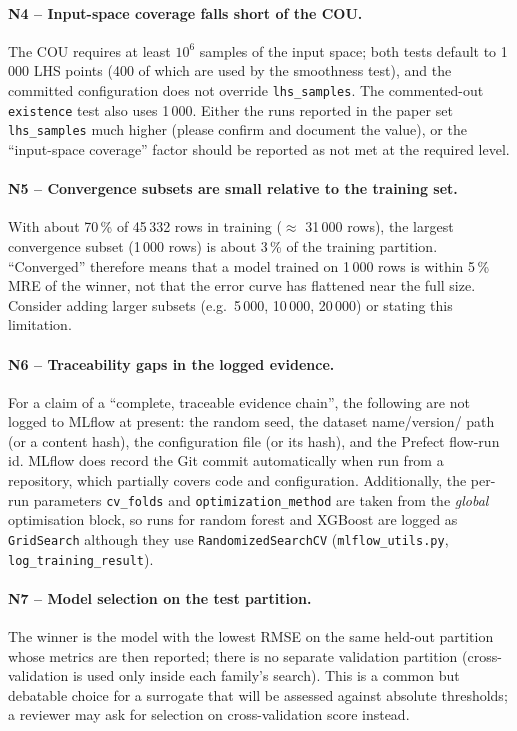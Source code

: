 \paragraph{N4 -- Input-space coverage falls short of the COU.}
The COU requires at least $10^6$ samples of the input space; both tests
default to 1\,000 LHS points (400 of which are used by the smoothness test),
and the committed configuration does not override \texttt{lhs\_samples}. The
commented-out \texttt{existence} test also uses 1\,000. Either the runs
reported in the paper set \texttt{lhs\_samples} much higher (please confirm
and document the value), or the ``input-space coverage'' factor should be
reported as not met at the required level.

\paragraph{N5 -- Convergence subsets are small relative to the training set.}
With about 70\,\% of 45\,332 rows in training ($\approx$ 31\,000 rows), the
largest convergence subset (1\,000 rows) is about 3\,\% of the training
partition. ``Converged'' therefore means that a model trained on 1\,000 rows
is within 5\,\% MRE of the winner, not that the error curve has flattened
near the full size. Consider adding larger subsets (e.g.\ 5\,000, 10\,000,
20\,000) or stating this limitation.

\paragraph{N6 -- Traceability gaps in the logged evidence.}
For a claim of a ``complete, traceable evidence chain'', the following are
not logged to MLflow at present: the random seed, the dataset name/version/
path (or a content hash), the configuration file (or its hash), and the
Prefect flow-run id. MLflow does record the Git commit automatically when
run from a repository, which partially covers code and configuration.
Additionally, the per-run parameters \texttt{cv\_folds} and
\texttt{optimization\_method} are taken from the \emph{global} optimisation
block, so runs for random forest and XGBoost are logged as
\texttt{GridSearch} although they use \texttt{RandomizedSearchCV}
(\texttt{mlflow\_utils.py}, \texttt{log\_training\_result}).

\paragraph{N7 -- Model selection on the test partition.}
The winner is the model with the lowest RMSE on the same held-out partition
whose metrics are then reported; there is no separate validation partition
(cross-validation is used only inside each family's search). This is a
common but debatable choice for a surrogate that will be assessed against
absolute thresholds; a reviewer may ask for selection on cross-validation
score instead.

